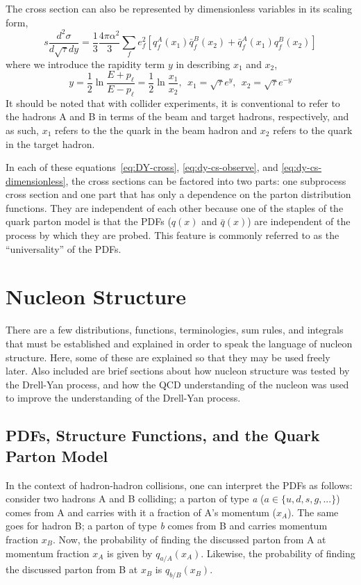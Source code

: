 The cross section can also be represented by dimensionless variables in its scaling form,
\begin{equation}
s \frac{d^2\sigma}{d \sqrt{\tau} dy} = 
\frac{1}{3}\frac{4\pi\alpha^2}{3}
\sum_{f}e_f^2[q_f^A(x_1)\bar{q}_f^B(x_2)+
\bar{q}_f^A(x_1)q_f^B(x_2)]
\label{eq:dy-cs-dimensionless}
\end{equation}
where we introduce the rapidity term $y$ in describing $x_1$ and $x_2$,
\begin{equation}
y  = \frac{1}{2} \ln \frac{E+ p_\ell}{E-p_\ell} = \frac{1}{2} \ln \frac{x_1}{x_2},\ \ 
x_1  = \sqrt{\tau} e^{y},\ \  
x_2  = \sqrt{\tau} e^{-y}
\end{equation}
It should be noted that with collider experiments, it is conventional to refer to the hadrons A and B in terms of the beam and target hadrons, respectively, and as such, $x_1$ refers to the the quark in the beam hadron and $x_2$ refers to the quark in the target hadron.

In each of these equations~\ref{eq:DY-cross}, \ref{eq:dy-cs-observe}, and \ref{eq:dy-cs-dimensionless}, the cross sections can be factored into two parts: one subprocess cross section and one part that has only a dependence on the parton distribution functions. They are independent of each other because one of the staples of the quark parton model is that the PDFs ($q(x)$ and $\bar{q}(x)$) are independent of the process by which they are probed. This feature is commonly referred to as the ``universality'' of the PDFs.

\section{Nucleon Structure}

There are a few distributions, functions, terminologies, sum rules, and integrals that must be established and explained in order to speak the language of nucleon structure. Here, some of these are explained so that they may be used freely later. Also included are brief sections about how nucleon structure was tested by the Drell-Yan process, and how the QCD understanding of the nucleon was used to improve the understanding of the Drell-Yan process.

\subsection{PDFs, Structure Functions, and the Quark Parton Model}\label{sec:pdf}

In the context of hadron-hadron collisions, one can interpret the PDFs as follows: consider two hadrons A and B colliding; a parton of type \emph{a} ($a\in \{u, d, s, g, ...\}$) comes from A and carries with it a fraction of A's momentum ($x_A$).  The same goes for hadron B; a parton of type \emph{b} comes from B and carries momentum fraction $x_B$. Now, the probability of finding the discussed parton from A at momentum fraction $x_A$ is given by $q_{a/A}(x_A)$. Likewise, the probability of finding the discussed parton from B at $x_B$ is $q_{b/B}(x_B)$.

